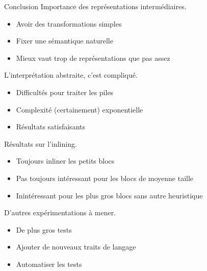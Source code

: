 \documentclass{beamer}
\begin{document}
\begin{frame}{Conclusion}
    Importance des représentations intermédiaires.

    \begin{itemize}
        \item Avoir des transformations simples
        \item Fixer une sémantique naturelle
        \item Mieux vaut trop de représentations que pas assez
    \end{itemize}

    L'interprétation abstraite, c'est compliqué.

    \begin{itemize}
        \item Difficultés pour traiter les piles
        \item Complexité (certainement) exponentielle
        \item Résultats satisfaisants
    \end{itemize}

    Résultats sur l'inlining.

    \begin{itemize}
        \item Toujours inliner les petits blocs
        \item Pas toujours intéressant pour les blocs de moyenne taille
        \item Inintéressant pour les plus gros blocs sans autre heuristique
    \end{itemize}

    D'autres expérimentations à mener.

    \begin{itemize}
        \item De plus gros tests
        \item Ajouter de nouveaux traits de langage
        \item Automatiser les tests
    \end{itemize}
\end{frame}
\end{document}
